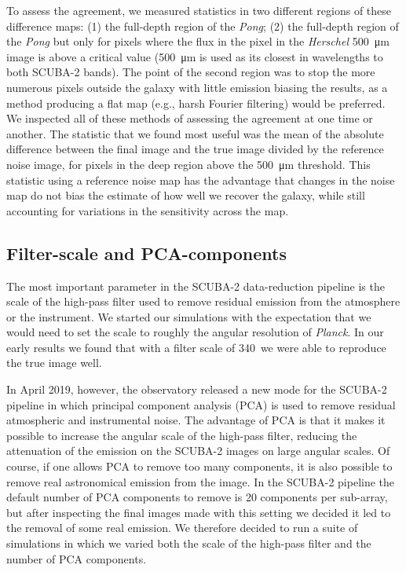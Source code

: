 \documentclass[a4paper,fleqn,usenatbib, twocolumn]{aastex63}
\begin{document}
To assess the agreement, we measured statistics in two different regions of these
difference maps:
(1) the full-depth region of the {\it Pong}; (2) the full-depth region of
the {\it Pong} but only for pixels where the flux in the pixel
in the {\it Herschel}  \SI{500}{\micro\meter} image is above a critical value
(\SI{500}{\micro\meter} is used as its closest in wavelengths to both SCUBA-2 bands).
The point of the second region was to stop the more numerous pixels outside the 
galaxy with little emission biasing the results, as a method producing a flat map
(e.g., harsh Fourier filtering) would be preferred.
We inspected all of these methods
of assessing the agreement at one time or another.
The statistic that we found most useful was the mean of the absolute difference
between the final image and the true image divided by the reference noise image,
for pixels in the deep region above the \SI{500}{\micro\meter} threshold. This statistic
using a reference noise map has the advantage that changes in the noise map do not bias the estimate
of how well we recover the galaxy, while still accounting for variations in the sensitivity across the map.


\subsection{Filter-scale and PCA-components}
\label{sec:PCAsims}

The most important parameter in the SCUBA-2 data-reduction pipeline is the scale of the high-pass filter used to remove residual emission from the atmosphere or
the instrument. We started our simulations with the expectation that we would need to set
the scale to roughly the angular resolution of {\it Planck}. In our early results we found that with a filter scale of 340\arcsec\ we were able to reproduce the true image well. 

In April 2019, however, the observatory released a new mode for the
SCUBA-2 pipeline in which principal component analysis (PCA) is
used to remove residual atmospheric and instrumental noise. The advantage of PCA is that it makes it possible to increase the
angular scale of the high-pass filter, reducing the attenuation of the
emission on the SCUBA-2 images on large angular scales. Of course, if one
allows PCA to remove too many components, it is also possible to remove
real astronomical emission from the image. In the SCUBA-2 pipeline the default number of PCA components
to remove is 20 components per sub-array, but after inspecting the final
images made with this setting we decided it led to the removal of
some real emission.
We therefore decided to run a suite of simulations in which we varied both the
scale of the high-pass filter and the number of PCA components.
\end{document}
